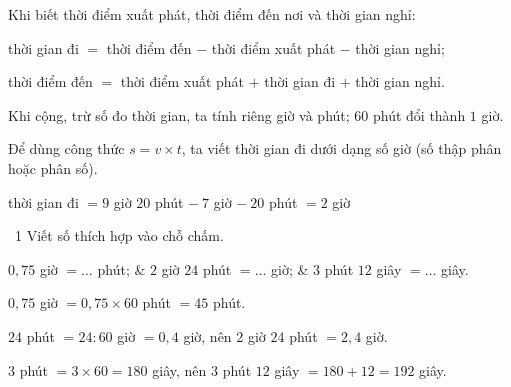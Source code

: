 \begin{knowbox}
\begin{minipage}[t]{0.58\linewidth}
Khi biết thời điểm xuất phát, thời điểm đến nơi và thời gian nghỉ:\par
\smallskip
thời gian đi $=$ thời điểm đến $-$ thời điểm xuất phát $-$ thời gian nghỉ;\par
thời điểm đến $=$ thời điểm xuất phát $+$ thời gian đi $+$ thời gian nghỉ.\par
\smallskip
Khi cộng, trừ số đo thời gian, ta tính riêng giờ và phút; $60$ phút đổi thành $1$ giờ.\par
\smallskip
Để dùng công thức $s=v\times t$, ta viết thời gian đi dưới dạng số giờ (số thập phân hoặc phân số).
\end{minipage}\hfill
\begin{minipage}[t]{0.38\linewidth}\vspace{4pt}\centering
{}\par\smallskip
{\small thời gian đi $=9$ giờ $20$ phút $-\ 7$ giờ $-\ 20$ phút $=2$ giờ}
\end{minipage}
\end{knowbox}
\gap
\begin{exbox}{\ExWord\ 1}
Viết số thích hợp vào chỗ chấm.
\begin{cols3}
 $0{,}75$ giờ $=\dots$ phút; &  $2$ giờ $24$ phút $=\dots$ giờ; &  $3$ phút $12$ giây $=\dots$ giây.
\end{cols3}
\guide
{} $0{,}75$ giờ $=0{,}75\times60$ phút $=45$ phút.\par
{} $24$ phút $=24:60$ giờ $=0{,}4$ giờ, nên $2$ giờ $24$ phút $=2{,}4$ giờ.\par
{} $3$ phút $=3\times60=180$ giây, nên $3$ phút $12$ giây $=180+12=192$ giây.
\end{exbox}
\gap
